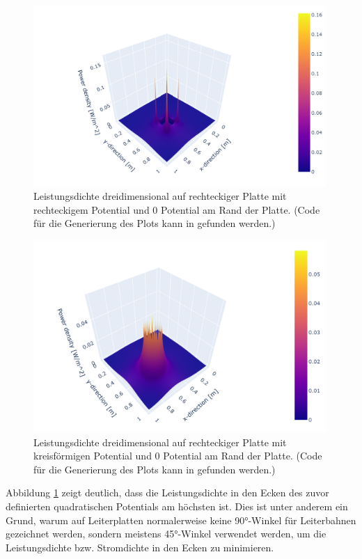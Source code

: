 \begin{figure}[h]
	\centering
	\includegraphics[width=0.99\textwidth]{papers/circuit/3d.png}
	\caption{Leistungsdichte dreidimensional auf rechteckiger Platte mit rechteckigem Potential und 0 Potential am Rand der Platte. (Code für die Generierung des Plots kann in \cite{github:AndreasFMueller} gefunden werden.)}
	\label{fig:power_3d_rectangle}
\end{figure}
\begin{figure}[h]
	\centering
	\includegraphics[width=0.99\textwidth]{papers/circuit/3d_circle.png}
	\caption{Leistungsdichte dreidimensional auf rechteckiger Platte mit kreisförmigen Potential und 0 Potential am Rand der Platte. (Code für die Generierung des Plots kann in \cite{github:AndreasFMueller} gefunden werden.)}
	\label{fig:power_3d_circle}
\end{figure}
Abbildung \ref{fig:power_3d_rectangle} zeigt deutlich, dass die Leistungsdichte in den Ecken des zuvor definierten quadratischen Potentials am höchsten ist. Dies ist unter anderem ein Grund, warum auf Leiterplatten normalerweise keine 90°-Winkel für Leiterbahnen gezeichnet werden, sondern meistens 45°-Winkel verwendet werden, um die Leistungsdichte bzw. Stromdichte in den Ecken zu minimieren.


